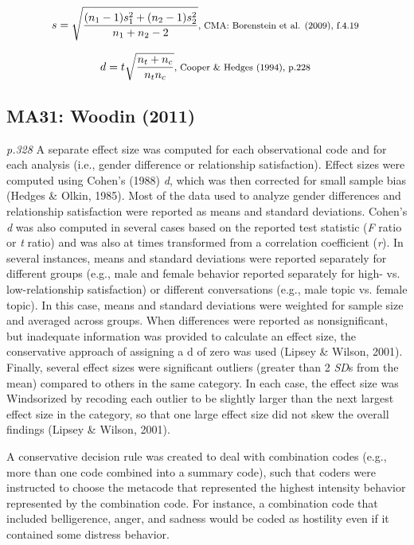 \documentclass{article}
\begin{document}
\begin{equation*}
s={\sqrt {\frac {(n_{1}-1)s_{1}^{2}+(n_{2}-1)s_{2}^{2}}{n_{1}+n_{2}-2}}} \mbox{\footnotesize, CMA: Borenstein et al. (2009), f.4.19 } 
\end{equation*}

\begin{equation*}
d = {t {\sqrt {\frac {n_{t} + n_{c}}{n_{t}n_{c}}}}} \mbox{\footnotesize, Cooper \& Hedges (1994), p.228 }
\end{equation*}

\subsection*{MA31: Woodin (2011)}

\textit{p.328} A separate effect size was computed for each observational code and for each analysis (i.e., gender difference or relationship satisfaction). Effect sizes were computed using Cohen’s (1988) \textit{d}, which was then corrected for small sample bias (Hedges \& Olkin, 1985). Most of the data used to analyze gender differences and relationship satisfaction were reported as means and standard deviations. Cohen’s \textit{d} was also computed in several cases based on the reported test statistic (\textit{F} ratio or \textit{t} ratio) and was also at times transformed from a correlation coefficient (\textit{r}). In several instances, means and standard deviations were reported separately for different groups (e.g., male and female behavior reported separately for high- vs. low-relationship satisfaction) or different conversations (e.g., male topic vs. female topic). In this case, means and standard deviations were weighted for sample size and averaged across groups. When differences were reported as nonsignificant, but inadequate information was provided to calculate an effect size, the conservative approach of assigning a d of zero was used (Lipsey \& Wilson, 2001). Finally, several effect sizes were significant outliers (greater than 2 \textit{SD}s from the mean) compared to others in the same category. In each case, the effect size was Windsorized by recoding each outlier to be slightly larger than the next largest effect size in the category, so that one large effect size did not skew the overall findings (Lipsey \& Wilson, 2001).

A conservative decision rule was created to deal with combination codes (e.g., more than one code combined into a summary code), such that coders were instructed to choose the metacode that represented the highest intensity behavior represented by the combination code. For instance, a combination code that included belligerence, anger, and sadness would be coded as hostility even if it contained some distress behavior.
\end{document}
